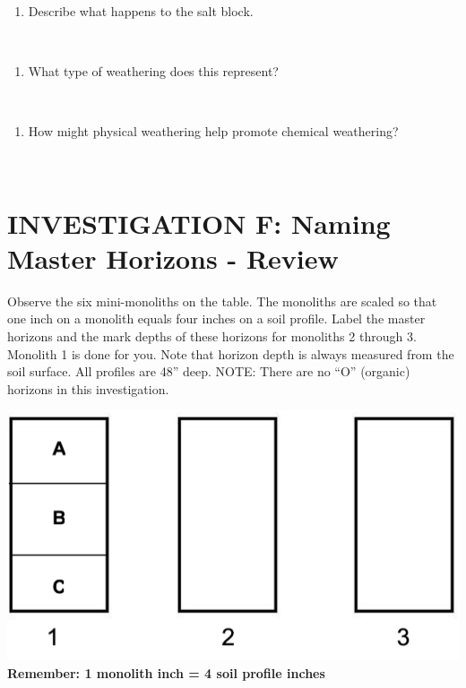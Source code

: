 \documentclass[
  letterpaper,
  twocolumn,
  portrait]{scrbook}
\providecommand{\tightlist}{%
  \setlength{\itemsep}{0pt}\setlength{\parskip}{0pt}}\usepackage{longtable,booktabs,array}
\begin{document}
\begin{enumerate}
\def\labelenumi{\alph{enumi}.}
\setcounter{enumi}{1}
\tightlist
\item
  Describe what happens to the salt block.
\end{enumerate}

~ ~ ~

\begin{enumerate}
\def\labelenumi{\alph{enumi}.}
\setcounter{enumi}{2}
\tightlist
\item
  What type of weathering does this represent?
\end{enumerate}

~ ~ ~

\begin{enumerate}
\def\labelenumi{\arabic{enumi}.}
\setcounter{enumi}{2}
\tightlist
\item
  How might physical weathering help promote chemical weathering?
\end{enumerate}

~ ~ ~

\hypertarget{investigation-f-naming-master-horizons---review}{%
\section{INVESTIGATION F: Naming Master Horizons -
Review}\label{investigation-f-naming-master-horizons---review}}

Observe the six mini-monoliths on the table. The monoliths are scaled so
that one inch on a monolith equals four inches on a soil profile. Label
the master horizons and the mark depths of these horizons for monoliths
2 through 3. Monolith 1 is done for you. Note that horizon depth is
always measured from the soil surface. All profiles are 48'' deep. NOTE:
There are no ``O'' (organic) horizons in this investigation.

\includegraphics{naming-master-horizons-Picture1.png} \textbf{Remember:
1 monolith inch = 4 soil profile inches}
\end{document}
